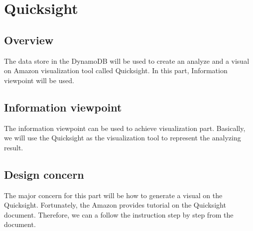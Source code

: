  \section{Quicksight}
    \subsection{Overview}
    The data store in the DynamoDB will be used to create an analyze and a visual on Amazon visualization tool called Quicksight. In this part, Information viewpoint will be used.
    \subsection{Information viewpoint}
    The information viewpoint can be used to achieve visualization part. Basically, we will use the Quicksight as the visualization tool to represent the analyzing result.
    \subsection{Design concern} 
    The major concern for this part will be how to generate a visual on the Quicksight. Fortunately, the Amazon provides tutorial on the Quicksight document. Therefore, we can a follow the instruction step by step from the document.    
